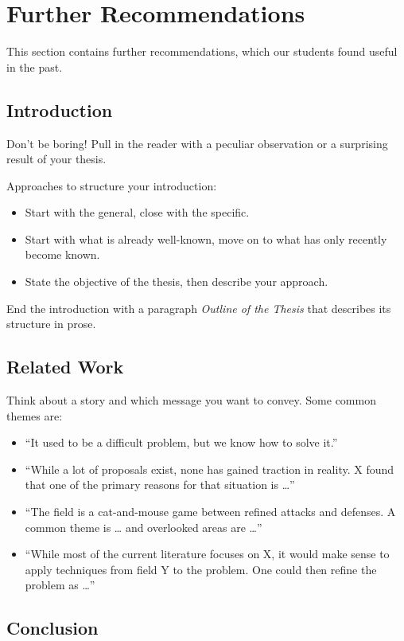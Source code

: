  
\chapter{Further Recommendations}

This section contains further recommendations, which our students found useful in the past.

\section{Introduction}

Don’t be boring! Pull in the reader with a peculiar observation or a surprising result of your thesis.

Approaches to structure your introduction:
\begin{itemize}
\item Start with the general, close with the specific.
\item Start with what is already well-known, move on to what has only recently become known.
\item State the objective of the thesis, then describe your approach.
\end{itemize}

End the introduction with a paragraph \emph{Outline of the Thesis} that describes its structure in prose.

\section{Related Work}

Think about a story and which message you want to convey. Some common themes are:
\begin{itemize}
\item “It used to be a difficult problem, but we know how to solve it.”
\item “While a lot of proposals exist, none has gained traction in reality. X found that one of the primary reasons for that situation is …”
\item “The field is a cat-and-mouse game between refined attacks and defenses. A common theme is … and overlooked areas are …”
\item “While most of the current literature focuses on X, it would make sense to apply techniques from field Y to the problem. One could then refine the problem as …”
\end{itemize}

\section{Conclusion}

